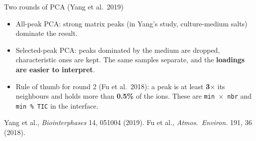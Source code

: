\documentclass[aspectratio=169,10pt]{beamer}
\newcommand{\hl}[1]{{\color{warm}\bfseries #1}}
\newcommand{\ui}[1]{\texttt{\color{navy}#1}}
\begin{document}
\begin{frame}{Two rounds of PCA (Yang et al.\ 2019)}
  \centering
  \vspace{3mm}
  \begin{itemize}\setlength\itemsep{2mm}\large
    \item All-peak PCA: strong matrix peaks (in Yang's study, culture-medium salts) dominate the result.
    \item Selected-peak PCA: peaks dominated by the medium are dropped, characteristic ones are kept. The same samples separate, and the \hl{loadings are easier to interpret}.
    \item Rule of thumb for round 2 (Fu et al.\ 2018): a peak is at least \hl{3$\times$} its neighbours and holds more than \hl{0.5\%} of the ions. These are \ui{min $\times$ nbr} and \ui{min \% TIC} in the interface.
  \end{itemize}
  \vfill
  {\scriptsize Yang et al., \textit{Biointerphases} 14, 051004 (2019). \quad Fu et al., \textit{Atmos.\ Environ.} 191, 36 (2018).}
\end{frame}
\end{document}
